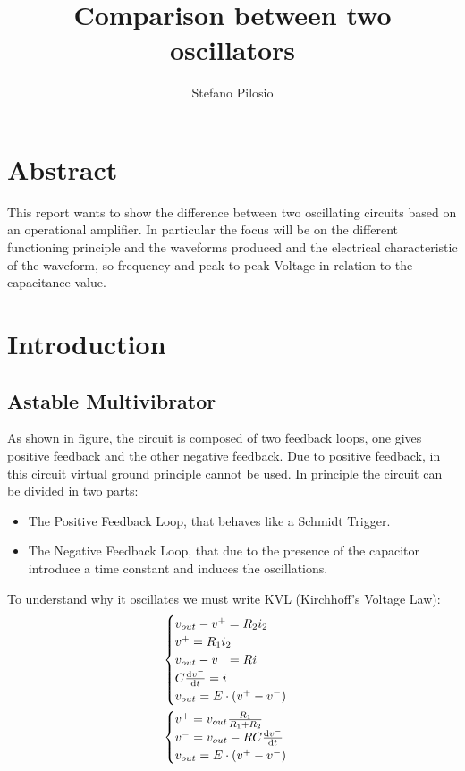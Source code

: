 \documentclass[a4paper, twocolumn]{article}
\begin{document}
\title{Comparison between two oscillators}
\author{Stefano Pilosio}

\maketitle

\section{Abstract}

This report wants to show the difference between two oscillating circuits based on an operational amplifier. In particular the focus will be on the different functioning principle and the waveforms produced and the electrical characteristic of the waveform, so frequency and peak to peak Voltage in relation to the capacitance value.

\section{Introduction}

\subsection{Astable Multivibrator}


\begin{center}
    \centering
    \def \svgwidth{0.95\columnwidth}
    
\end{center}

As shown in figure, the circuit is composed of two feedback loops, one gives positive feedback and the other negative feedback. Due to positive feedback, in this circuit virtual ground principle cannot be used. In principle the circuit can be divided in two parts:

\begin{itemize}
    \item The Positive Feedback Loop, that behaves like a Schmidt Trigger.
    \item The Negative Feedback Loop, that due to the presence of the capacitor introduce a time constant and induces the oscillations.
\end{itemize}

To understand why it oscillates we must write KVL (Kirchhoff's Voltage Law):
\begin{gather}
    \begin{cases}
        v_{out} - v^+ = R_2i_2\\
        v^+= R_1i_2\\
        v_{out}-v^- = R i\\
        C\dv{v^-}{t}= i\\
        v_{out} = E \cdot (v^+-v^-)
    \end{cases}\\
    \begin{cases}
        \label{eq:genStable}
        v^+=v_{out}\frac{R_1}{R_1+R_2}\\
        v^-=v_{out}-RC\dv{v^-}{t}\\
        v_{out} = E \cdot (v^+-v^-)
    \end{cases}
\end{gather}
\end{document}

